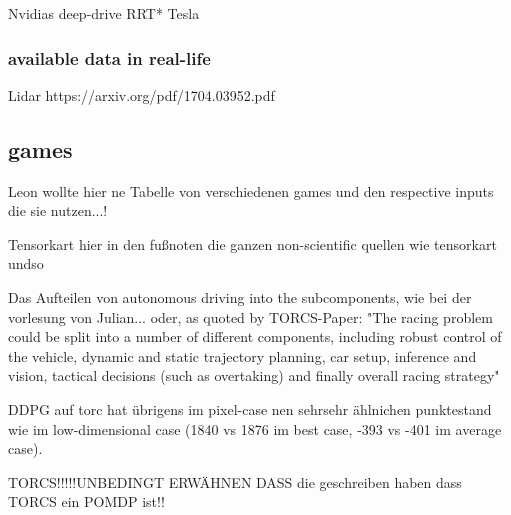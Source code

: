 Nvidias deep-drive
RRT*
Tesla

\subsubsection{available data in real-life}

Lidar
https://arxiv.org/pdf/1704.03952.pdf


\subsection{games}

Leon wollte hier ne Tabelle von verschiedenen games und den respective inputs die sie nutzen...!


\begin{table}
\end{table}

Tensorkart
hier in den fußnoten die ganzen non-scientific quellen wie tensorkart undso

Das Aufteilen von autonomous driving into the subcomponents, wie bei der vorlesung von Julian... oder, as quoted by TORCS-Paper: "The racing problem could be split into a number of different components, including robust control of the vehicle, dynamic and static trajectory planning, car setup, inference and vision, tactical decisions (such as overtaking) and finally overall racing strategy"

DDPG auf torc hat übrigens im pixel-case nen sehrsehr ählnichen punktestand wie im low-dimensional case (1840 vs 1876 im best case, -393 vs -401 im average case).


TORCS!!!!!UNBEDINGT ERWÄHNEN DASS die geschreiben haben dass TORCS ein POMDP ist!!
